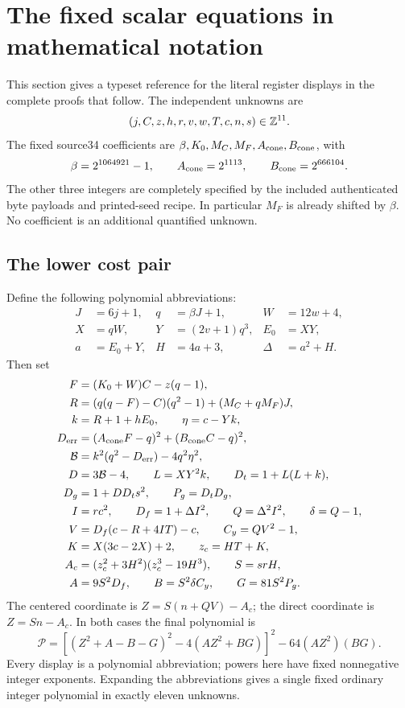 \section{The fixed scalar equations in mathematical notation}
This section gives a typeset reference for the literal register displays in the complete proofs that follow. The independent unknowns are
\[
 (j,C,z,h,r,v,w,T,c,n,s)\in\mathbb Z^{11}.
\]
The fixed source34 coefficients are $\beta,K_0,M_C,M_F,A_{\rm cone},B_{\rm cone}$, with
\[
 \beta=2^{1064921}-1,\qquad A_{\rm cone}=2^{1113},\qquad B_{\rm cone}=2^{666104}.
\]
The other three integers are completely specified by the included authenticated byte payloads and printed-seed recipe. In particular $M_F$ is already shifted by $\beta$. No coefficient is an additional quantified unknown.

\subsection{The lower cost pair}
Define the following polynomial abbreviations:
\begin{align*}
 J&=6j+1,&q&=\beta J+1,&W&=12w+4,\\
 X&=qW,&Y&=(2v+1)q^3,&E_0&=XY,\\
 a&=E_0+Y,&H&=4a+3,&\Delta&=a^2+H.
\end{align*}
Then set
\begin{align*}
 F&=(K_0+W)C-z(q-1),\\
 R&=(q(q-F)-C)(q^2-1)+(M_C+qM_F)J,\\
 k&=R+1+hE_0,\qquad \eta=c-Yk,\\
 D_{\rm err}&=(A_{\rm cone}F-q)^2+(B_{\rm cone}C-q)^2,\\
 \mathcal B&=k^2(q^2-D_{\rm err})-4q^2\eta^2,\\
 D&=3\mathcal B-4,\qquad L=XY^2k,\qquad D_t=1+L(L+k),\\
 D_g&=1+DD_ts^2,\qquad P_g=D_tD_g,\\
 I&=rc^2,\qquad D_f=1+\Delta I^2,\qquad Q=\Delta^2 I^2,\qquad\delta=Q-1,\\
 V&=D_f(c-R+4IT)-c,\qquad C_y=QV^2-1,\\
 K&=X(3c-2X)+2,\qquad z_c=HT+K,\\
 A_c&=(z_c^2+3H^2)(z_c^3-19H^3),\qquad S=srH,\\
 A&=9S^2D_f,\qquad B=S^2\delta C_y,\qquad G=81S^2P_g.
\end{align*}
The centered coordinate is $Z=S(n+QV)-A_c$; the direct coordinate is $Z=Sn-A_c$. In both cases the final polynomial is
\begin{equation}\label{eq:paired}
 \mathcal P=
 \left[(Z^2+A-B-G)^2-4(AZ^2+BG)\right]^2
 -64(AZ^2)(BG).
\end{equation}
Every display is a polynomial abbreviation; powers here have fixed nonnegative integer exponents. Expanding the abbreviations gives a single fixed ordinary integer polynomial in exactly eleven unknowns.

